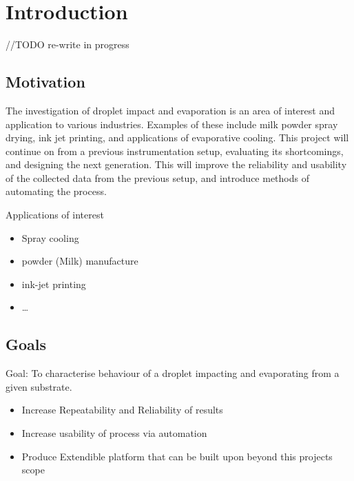 \chapter{Introduction}\label{C:intro}

//TODO re-write in progress

\section{Motivation}

The investigation of droplet impact and evaporation is an area of interest and application to various industries. Examples of these include milk powder spray drying, ink jet printing, and applications of evaporative cooling. This project will continue on from a previous instrumentation setup, evaluating its shortcomings, and designing the next generation. This will improve the reliability and usability of the collected data from the previous setup, and introduce methods of automating the process. 

Applications of interest
\begin{itemize}
    \item Spray cooling
    \item  powder (Milk) manufacture
    \item ink-jet printing
    \item \dots
\end{itemize}

\section{Goals}
Goal: To characterise behaviour of a droplet impacting and evaporating from a given substrate.
\begin{itemize}
    \item Increase Repeatability and Reliability of results
    \item Increase usability of process via automation 
    \item Produce Extendible platform that can be built upon beyond this projects scope 
\end{itemize}